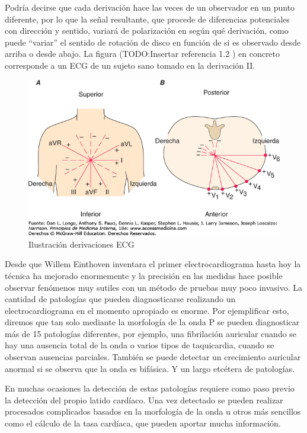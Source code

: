 Podría decirse que cada derivación hace las veces de un observador en un punto diferente, por lo que la señal resultante, que procede de diferencias potenciales con dirección y sentido, variará de polarización en según qué derivación, como puede “variar” el sentido de rotación de disco en función de si es observado desde arriba o desde abajo. La figura (TODO:Insertar referencia  1.2 ) en concreto corresponde a un ECG de un sujeto sano tomado en la derivación II.

\begin{figure}[ht]
	\centering
		\includegraphics[width=0.9\linewidth]{figuras/derivations.png}
	\caption{Ilustración derivaciones ECG}
	\label{fig:derivaciones}
\end{figure} 

Desde que Willem Einthoven inventara el primer electrocardiograma hasta hoy la técnica ha mejorado enormemente y la precisión en las medidas hace posible observar fenómenos muy sutiles con un método de pruebas muy poco invasivo. La cantidad de patologías que pueden diagnosticarse realizando un electrocardiograma en el momento apropiado es enorme. \cite{PatologiasECG} Por ejemplificar esto, diremos que tan solo mediante la morfología de la onda P se pueden diagnosticar más de 15 patologías diferentes, por ejemplo, una fibrilación auricular cuando se hay una ausencia total de la onda o varios tipos de taquicardia, cuando se observan ausencias parciales. También se puede detectar un crecimiento auricular anormal si se observa que la onda es bifásica. Y un largo etcétera de patologías.

En muchas ocasiones la detección de estas patologías requiere como paso previo la detección del propio latido cardíaco. Una vez detectado se pueden realizar procesados complicados basados en la morfología de la onda u otros más sencillos como el cálculo de la tasa cardíaca, que pueden aportar mucha información.

